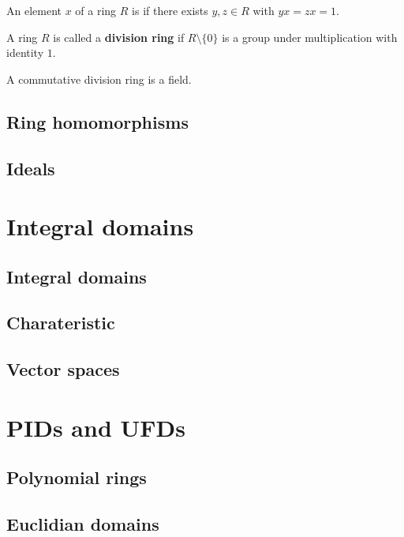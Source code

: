 \documentclass[../Year2.tex]{subfiles}
\begin{document}
\begin{definition}[Invertible]
    An element $x$ of a ring $R$ is  if there exists $y,z\in R$ with $yx=zx=1$.
\end{definition}

\begin{definition}
    A ring $R$ is called a \textbf{division ring} if $R\setminus\{0\}$ is a group under multiplication with identity $1$.
\end{definition}

\begin{remark}
    A commutative division ring is a field.
\end{remark}

\subsection{Ring homomorphisms}

\subsection{Ideals}

\section{Integral domains}

\subsection{Integral domains}

\subsection{Charateristic}

\subsection{Vector spaces}

\section{PIDs and UFDs}

\subsection{Polynomial rings}

\subsection{Euclidian domains}
\end{document}
